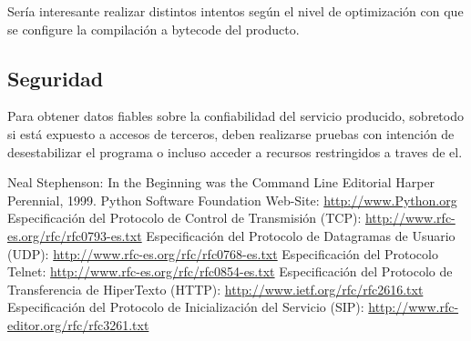\documentclass[a4paper,spanish,12pt]{book}
\begin{document}
Sería interesante realizar distintos intentos según el nivel de optimización con que se configure la compilación a bytecode del producto.


\subsection{Seguridad}
Para obtener datos fiables sobre la confiabilidad del servicio producido, sobretodo si está expuesto a accesos de terceros, deben realizarse pruebas con intención de desestabilizar el programa o incluso acceder a recursos restringidos a traves de el.


\appendix


\begin{thebibliography}{99}
 Neal Stephenson: In the Beginning was the Command Line
	Editorial Harper Perennial, 1999.
 Python Software Foundation Web-Site: \url{http://www.Python.org}
 Especificación del Protocolo de Control de Transmisión (TCP): \url{http://www.rfc-es.org/rfc/rfc0793-es.txt}
 Especificación del Protocolo de Datagramas de Usuario (UDP): \url{http://www.rfc-es.org/rfc/rfc0768-es.txt}
 Especificación del Protocolo Telnet: \url{http://www.rfc-es.org/rfc/rfc0854-es.txt}
 Especificación del Protocolo de Transferencia de HiperTexto (HTTP): \url{http://www.ietf.org/rfc/rfc2616.txt}
 Especificación del Protocolo de Inicialización del Servicio (SIP): \url{http://www.rfc-editor.org/rfc/rfc3261.txt}
\end{thebibliography}
\end{document}
